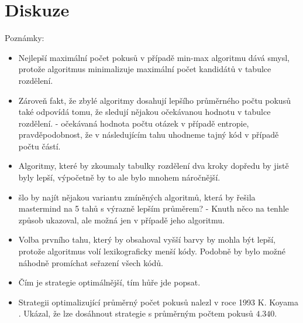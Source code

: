 \section{Diskuze}
Poznámky:
\begin{itemize}
    \item Nejlepší maximální počet pokusů v případě min-max algoritmu dává smysl, protože algoritmus minimalizuje maximální počet kandidátů v tabulce rozdělení. 
    \item Zároveň fakt, že zbylé algoritmy dosahují lepšího průměrného počtu pokusů také odpovídá tomu, že sledují nějakou očekávanou hodnotu v tabulce rozdělení. - očekávaná hodnota počtu otázek v případě entropie, pravděpodobnost, že v následujícím tahu uhodneme tajný kód v případě počtu částí. 
    \item Algoritmy, které by zkoumaly tabulky rozdělení dva kroky dopředu by jistě byly lepší, výpočetně by to ale bylo mnohem náročnější.
    \item šlo by najít nějakou variantu zmíněných algoritmů, která by řešila mastermind na 5 tahů s výrazně lepším průměrem? - Knuth něco na tenhle způsob ukazoval, ale možná jen v případě jeho algoritmu.
    \item Volba prvního tahu, který by obsahoval vyšší barvy by mohla být lepší, protože algoritmus volí lexikograficky menší kódy. Podobně by bylo možné náhodně promíchat seřazení všech kódů. 
    \item Čím je strategie optimálnější, tím hůře jde popsat.
    \item Strategii optimalizující průměrný počet pokusů nalezl v roce 1993 K. Koyama \cite{koyama}. Ukázal, že lze dosáhnout strategie s průměrným počtem pokusů $4.340$.
\end{itemize}





